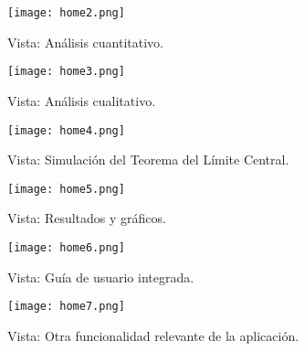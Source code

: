 \documentclass[12pt]{article}
\begin{document}
\begin{figure}[h!]
    \centering
    \texttt{[image: home2.png]}
    \caption{Vista: Análisis cuantitativo.}
\end{figure}

\begin{figure}[h!]
    \centering
    \texttt{[image: home3.png]}
    \caption{Vista: Análisis cualitativo.}
\end{figure}

\begin{figure}[h!]
    \centering
    \texttt{[image: home4.png]}
    \caption{Vista: Simulación del Teorema del Límite Central.}
\end{figure}

\begin{figure}[h!]
    \centering
    \texttt{[image: home5.png]}
    \caption{Vista: Resultados y gráficos.}
\end{figure}

\begin{figure}[h!]
    \centering
    \texttt{[image: home6.png]}
    \caption{Vista: Guía de usuario integrada.}
\end{figure}

\begin{figure}[h!]
    \centering
    \texttt{[image: home7.png]}
    \caption{Vista: Otra funcionalidad relevante de la aplicación.}
\end{figure}

\clearpage
\end{document}

